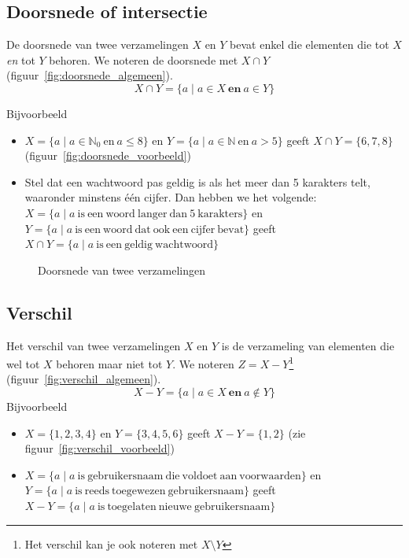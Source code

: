\subsection{Doorsnede of intersectie}
De doorsnede van twee verzamelingen $X$ en $Y$ bevat enkel die elementen die tot $X$ \emph{en} tot $Y$ behoren. We noteren de doorsnede met $X\cap Y$ (figuur~\ref{fig:doorsnede_algemeen}).
\begin{equation*}
X\cap Y =\{a \mid a\in X ~\mathbf{en}~a\in Y \}
\end{equation*}

Bijvoorbeeld
\begin{itemize}
\item $X=\{a \mid a\in \mathbb{N}_0 ~\mathrm{en}~a\leqslant 8\}$ en $Y=\{a \mid a\in \mathbb{N} ~\mathrm{en}~a>5\}$ geeft $X\cap Y=\{6,7,8\}$ (figuur~\ref{fig:doorsnede_voorbeeld})
\item Stel dat een wachtwoord pas geldig is als het meer dan 5 karakters telt, waaronder minstens één cijfer. Dan hebben we het volgende: \\
$X=\{a\mid a ~\mathrm{is~een~woord~langer~dan~5~karakters} \}$ en \\$Y=\{a\mid a~ \mathrm{is~een~woord~dat~ook~een~cijfer~bevat } \}$ geeft \\
$X\cap Y=\{a \mid a~\mathrm{is~een~geldig~wachtwoord} \}$

\end{itemize}

\begin{figure}[htbp]
\centering
{}\qquad
\subfloat[$\{a \mid a\in \mathbb{N}_0 ~\mathrm{en}~a\leqslant 8\}\cap\{a \mid a\in \mathbb{N} ~\mathrm{en}~a>5\}
	=\{6,7,8\}$]{

    \label{fig:doorsnede_voorbeeld}
}
\caption{Doorsnede van twee verzamelingen}
\end{figure}

\subsection{Verschil}
Het verschil van twee verzamelingen $X$ en $Y$ is de verzameling van elementen die wel tot $X$ behoren maar niet tot $Y$. We noteren $Z=X-Y$\footnote{Het verschil kan je ook noteren met $X\setminus Y$} (figuur~\ref{fig:verschil_algemeen}).
\begin{equation*}
X-Y=\{a\mid a\in X ~\mathbf{en}~a\not \in Y\}
\end{equation*}
Bijvoorbeeld
\begin{itemize}
\item $X=\{1,2,3,4\}$ en $Y=\{ 3,4,5,6\}$ geeft $X-Y=\{1,2\}$ (zie figuur~\ref{fig:verschil_voorbeeld})
\item $X=\{a\mid a ~\mathrm{is~gebruikersnaam~die~voldoet~aan~voorwaarden}\}$ en \\$Y=\{a\mid a~\mathrm{is~reeds~toegewezen~gebruikersnaam}\}$ geeft 
\\$X-Y=\{a\mid a~\mathrm{is~toegelaten~nieuwe~gebruikersnaam}\}$
\end{itemize}

